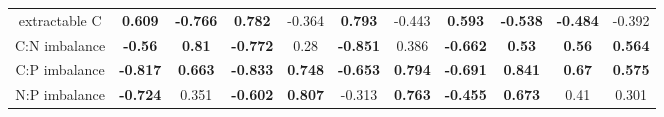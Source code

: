 \documentclass[authoryear,preprint,review,12pt]{elsarticle}
\begin{document}
\begin{table}[h!]
\begin{center}
{\begin{tabular}{ccccccccccc}
  extractable C & \textbf{ 0.609 } & \textbf{ -0.766 } & \textbf{ 0.782 } & -0.364 & \textbf{ 0.793 } & -0.443 & \textbf{ 0.593 } & \textbf{ -0.538 } & \textbf{ -0.484 } & -0.392 \\ 
  C:N imbalance & \textbf{ -0.56 } & \textbf{ 0.81 } & \textbf{ -0.772 } & 0.28 & \textbf{ -0.851 } & 0.386 & \textbf{ -0.662 } & \textbf{ 0.53 } & \textbf{ 0.56 } & \textbf{ 0.564 } \\ 
  C:P imbalance & \textbf{ -0.817 } & \textbf{ 0.663 } & \textbf{ -0.833 } & \textbf{ 0.748 } & \textbf{ -0.653 } & \textbf{ 0.794 } & \textbf{ -0.691 } & \textbf{ 0.841 } & \textbf{ 0.67 } & \textbf{ 0.575 } \\ 
  N:P imbalance & \textbf{ -0.724 } & 0.351 & \textbf{ -0.602 } & \textbf{ 0.807 } & -0.313 & \textbf{ 0.763 } & \textbf{ -0.455 } & \textbf{ 0.673 } & 0.41 & 0.301 \\ 
   \hline
\end{tabular}
}
\end{center}
\end{table}
\end{document}
